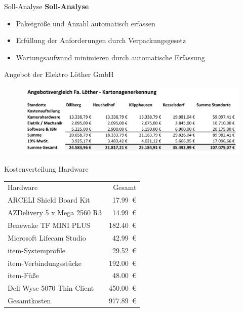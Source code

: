 \documentclass[10pt,ngerman]{beamer}
\begin{document}
\begin{frame}[fragile]{Soll-Analyse}
  \textbf{Soll-Analyse}
  \begin{itemize}
    \item Paketgröße und Anzahl automatisch erfassen
    \item Erfüllung der Anforderungen durch Verpackungsgesetz
    \item Wartungsaufwand minimieren durch automatische Erfassung
  \end{itemize}
\end{frame}


\begin{frame}[fragile]{Angebot der Elektro Löther GmbH}
  \begin{figure}[htpb]
    \centering
    \includegraphics[width=1\textwidth]{pics/AngebotLoether.png}
  \end{figure}
\end{frame}


\begin{frame}[fragile]{Kostenverteilung Hardware}
  \begin{table}[htbp]
    \centering
    \begin{tabular}{lr}
      Hardware                    & Gesamt         \\
      ARCELI Shield Board Kit     & \SI{17.99}{€}  \\
      AZDelivery 5 x Mega 2560 R3 & \SI{14.99}{€}  \\
      Benewake TF MINI PLUS       & \SI{182.40}{€} \\
      Microsoft Lifecam Studio    & \SI{42.99}{€}  \\
      item-Systemprofile          & \SI{29.52}{€}  \\
      item-Verbindungsstücke      & \SI{192.00}{€} \\
      item-Füße                   & \SI{48.00}{€}  \\
      Dell Wyse 5070 Thin Client  & \SI{450.00}{€} \\
      \hline
      Gesamtkosten                & \SI{977.89}{€}
    \end{tabular}
  \end{table}
\end{frame}
\end{document}
